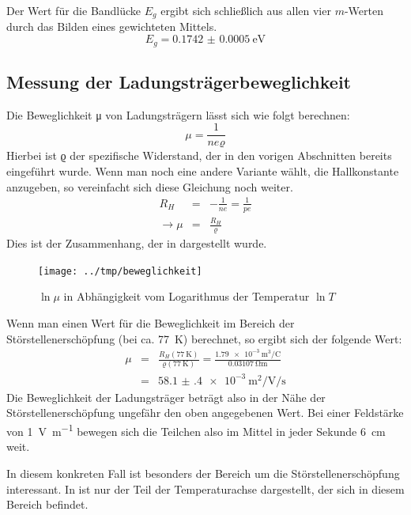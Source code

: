 Der Wert für die Bandlücke $E_g$ ergibt sich schließlich aus allen vier $m$-Werten durch
das Bilden eines gewichteten Mittels.
\begin{equation}
 E_g = \SI{0.1742(5)}{\electronvolt}
\end{equation}



\subsection{Messung der Ladungsträgerbeweglichkeit}

Die Beweglichkeit μ von Ladungsträgern lässt sich wie folgt berechnen:
\begin{equation}
μ = \frac{1}{neϱ}
\end{equation}
Hierbei ist ϱ der spezifische Widerstand, der in den vorigen Abschnitten
bereits eingeführt wurde. Wenn man noch eine andere Variante wählt, die
Hallkonstante anzugeben, so vereinfacht sich diese Gleichung noch weiter.
\begin{eqnarray}
R_H &=& -\frac{1}{ne} = \frac{1}{pe}\\
\rightarrow μ &=& \frac{R_H}{ϱ}
\end{eqnarray}
Dies ist der Zusammenhang, der in  dargestellt wurde.

\begin{figure}[htb]
   \centering
   \texttt{[image: ../tmp/beweglichkeit]}
   \caption{$\ln μ$ in Abhängigkeit vom Logarithmus der Temperatur $\ln T$}
   \label{fig:beweglichkeit}
\end{figure}

Wenn man einen Wert für die Beweglichkeit im Bereich der Störstellenerschöpfung
(bei ca. \SI{77}{\kelvin}) berechnet, so ergibt sich der folgende Wert:
\begin{eqnarray}
μ &=& \frac{R_H(\SI{77}{\kelvin})}{ϱ(\SI{77}{\kelvin})} =
\frac{\SI{1,79e-3}{\meter\cubed\per\coulomb}}{\SI{0.03107}{\ohm\meter}}\\
&=& \SI{58.1(4)e-3}{\meter\squared\per\volt\per\second}
\end{eqnarray}
Die Beweglichkeit der Ladungsträger beträgt also in der Nähe der
Störstellenerschöpfung ungefähr den oben angegebenen Wert. Bei einer Feldstärke
von \SI{1}{\volt\per\meter} bewegen sich die Teilchen also im Mittel in jeder
Sekunde \SI{6}{\centi\meter} weit.

In diesem konkreten Fall ist besonders der Bereich um die
Störstellenerschöpfung interessant. In  ist nur
der Teil der Temperaturachse dargestellt, der sich in diesem Bereich befindet.

